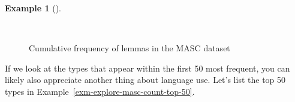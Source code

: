 \documentclass[
  letterpaper,
]{book}
\theoremstyle{definition}
\newtheorem{example}{Example}[chapter]
\theoremstyle{remark}
\begin{document}
\begin{example}[]\protect\hypertarget{exm-explore-masc-count-cumulative}{}\label{exm-explore-masc-count-cumulative}

~

\begin{figure}[!htb]


\caption{\label{fig-explore-masc-count-cumulative}Cumulative frequency
of lemmas in the MASC dataset}

\end{figure}%

\end{example}

If we look at the types that appear within the first 50 most frequent,
you can likely also appreciate another thing about language use. Let's
list the top 50 types in Example~\ref{exm-explore-masc-count-top-50}.
\end{document}
